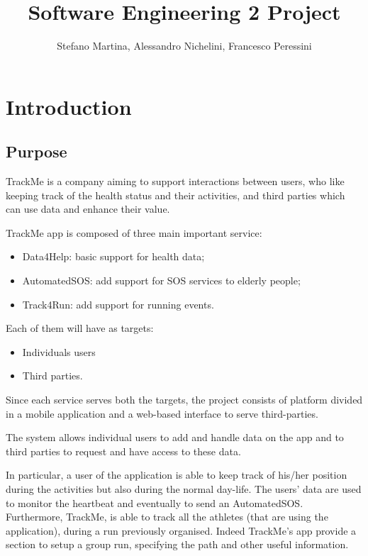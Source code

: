 \documentclass{article}
\title{Software Engineering 2 Project}
\author{Stefano Martina, Alessandro Nichelini, Francesco Peressini}
\begin{document}
\maketitle
\newpage

\tableofcontents
\newpage

\section{Introduction}

\subsection{Purpose}

TrackMe is a company aiming to support interactions between users, 
who like keeping track of the health status and their activities, and
third parties which can use data and enhance their value.

TrackMe app is composed of three main important service:
\begin{itemize}
\item Data4Help: basic support for health data;
\item AutomatedSOS: add support for SOS services to elderly people;
\item Track4Run: add support for running events.
\end{itemize}

Each of them will have as targets:
\begin{itemize}
\item Individuals users
\item Third parties.
\end{itemize}
Since each service serves both the targets, the project consists of 
platform divided in a mobile application and a web-based interface to
serve third-parties.

The system allows individual users to add and handle data on the app
and to third parties to request and have access to these data.

In particular, a user of the application is able to keep track of 
his/her position during the activities but also during the normal 
day-life. The users’ data are used to monitor the heartbeat and 
eventually to send an AutomatedSOS.
Furthermore, TrackMe, is able to track all the athletes (that are 
using the application), during a run previously organised. 
Indeed TrackMe’s app provide a section to setup a group run, 
specifying the path and other useful information.
\end{document}
